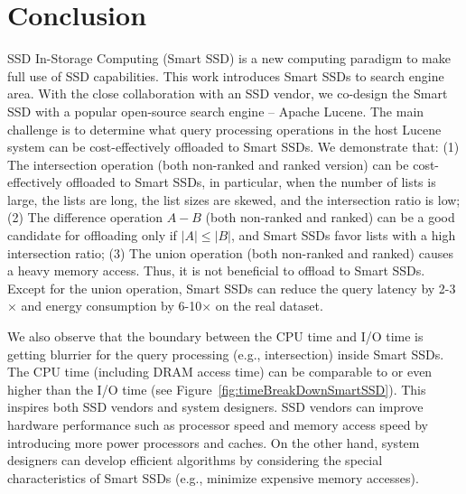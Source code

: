 
\section{Conclusion}\label{sec:conclusion}
SSD In-Storage Computing (Smart SSD) is a new computing paradigm to make full use of SSD capabilities.
This work introduces Smart SSDs to search engine area. With the close collaboration with an SSD vendor, we co-design the Smart SSD with a popular open-source search engine -- Apache Lucene.
The main challenge is to determine what query processing operations in the host Lucene system can be cost-effectively offloaded to Smart SSDs.
We demonstrate that: (1) The intersection operation (both non-ranked and ranked version) can be cost-effectively offloaded to Smart SSDs, in particular, when the number of lists is large, the lists are long, the list sizes are skewed, and the intersection ratio is low; (2) The difference operation $A-B$ (both non-ranked and ranked) can be a good candidate for offloading only if $|A| \le |B|$, and Smart SSDs favor lists with a high intersection ratio; (3) The union operation (both non-ranked and ranked) causes a heavy memory access. Thus, it is not beneficial to offload to Smart SSDs. Except for the union operation, Smart SSDs can reduce the query latency by 2-3$\times$ and energy consumption by 6-10$\times$ on the real dataset.

We also observe that the boundary between the CPU time and I/O time is getting blurrier for the query processing (e.g., intersection) inside Smart SSDs. The CPU time (including DRAM access time) can be comparable to or even higher than the I/O time (see Figure~\ref{fig:timeBreakDownSmartSSD}). This inspires both SSD vendors and system designers.
SSD vendors can improve hardware performance such as processor speed and memory access speed by introducing more power processors and caches. On the other hand, system designers can develop efficient algorithms by considering the special characteristics of Smart SSDs (e.g., minimize expensive memory accesses).



